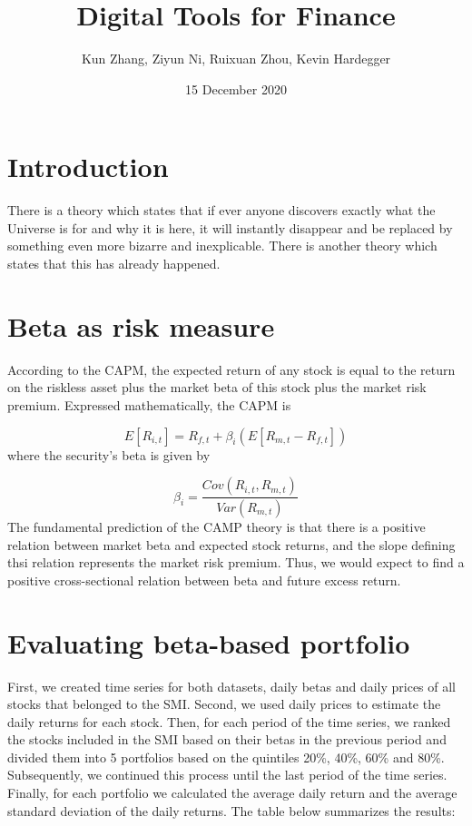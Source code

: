 \documentclass{article}
\title{Digital Tools for Finance}
\author{Kun Zhang, Ziyun Ni, Ruixuan Zhou, Kevin Hardegger }
\date{15 December 2020}
\begin{document}
\maketitle

\section{Introduction}
There is a theory which states that if ever anyone discovers exactly what the Universe is for and why it is here, it will instantly disappear and be replaced by something even more bizarre and inexplicable.
There is another theory which states that this has already happened.


\section{Beta as risk measure}
According to the CAPM, the expected return of any stock is equal to the return on the riskless asset plus the market beta of this stock plus the market risk premium. Expressed mathematically, the CAPM is

\begin{equation}
    E[R_{i,t}]=R_{f,t}+\beta_{i}(E[R_{m,t}-R_{f,t}])
\end{equation}
where the security’s beta is given by


\begin{equation}
     \beta_{i}=\frac{Cov(R_{i,t},R_{m,t})}{Var(R_{m,t})} 
\end{equation}
The fundamental prediction of the CAMP theory is that there is a positive relation between market beta and expected stock returns, and the slope defining thsi relation represents the market risk premium. Thus, we would expect to find a positive cross-sectional relation between beta and future excess return.

\section{Evaluating beta-based portfolio}
First, we created time series for both datasets, daily betas and daily prices of all stocks that belonged to the SMI. Second, we used daily prices to estimate the daily returns for each stock. Then, for each period of the time series, we ranked the stocks included in the SMI based on their betas in the previous period and divided them into 5 portfolios based on the quintiles 20\%, 40\%, 60\% and 80\%. Subsequently, we continued this process until the last period of the time series. Finally, for each portfolio we calculated the average daily return and the average standard deviation of the daily returns. The table below summarizes the results:
\end{document}
